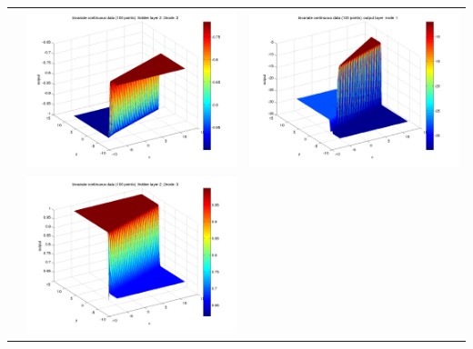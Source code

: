 \documentclass[fleqn]{article}
\begin{document}
\begin{center}
\begin{longtable}{ c | c | r }
     																		&   \includegraphics[scale=0.25]{./pics/bivariate100/_2_4/_2_4_epoch_2_hidden layer 2 :22}  & \includegraphics[scale=0.25]{./pics/bivariate100/_2_4/_2_4_epoch_2_output layer :1}  \\ 
     																		&   \includegraphics[scale=0.25]{./pics/bivariate100/_2_4/_2_4_epoch_2_hidden layer 2 :23} &  \\

\end{longtable}
\end{center}
\end{document}
